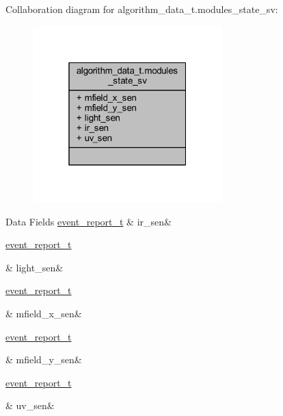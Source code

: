 Collaboration diagram for algorithm\+\_\+data\+\_\+t.\+modules\+\_\+state\+\_\+sv\+:\nopagebreak
\begin{figure}[H]
\begin{center}
\leavevmode
\includegraphics[width=208pt]{dc/dfa/a00894}
\end{center}
\end{figure}
\begin{DoxyFields}{Data Fields}
\hypertarget{a00016_a5e2b6893d5a2a9e34501aaf867eaaf90}{\hyperlink{a00021_d6/d66/a00441}{event\+\_\+report\+\_\+t}}\label{a00016_a5e2b6893d5a2a9e34501aaf867eaaf90}
&
ir\+\_\+sen&
\\
\hline

\hypertarget{a00016_a8f29254ed7e83d28cc0cbc627740d629}{\hyperlink{a00021_d6/d66/a00441}{event\+\_\+report\+\_\+t}}\label{a00016_a8f29254ed7e83d28cc0cbc627740d629}
&
light\+\_\+sen&
\\
\hline

\hypertarget{a00016_a36e4effee17b7c23c775d9abddf77e9b}{\hyperlink{a00021_d6/d66/a00441}{event\+\_\+report\+\_\+t}}\label{a00016_a36e4effee17b7c23c775d9abddf77e9b}
&
mfield\+\_\+x\+\_\+sen&
\\
\hline

\hypertarget{a00016_a2fdd54461101ce9d18996ebe403fc3e5}{\hyperlink{a00021_d6/d66/a00441}{event\+\_\+report\+\_\+t}}\label{a00016_a2fdd54461101ce9d18996ebe403fc3e5}
&
mfield\+\_\+y\+\_\+sen&
\\
\hline

\hypertarget{a00016_a7f1a3b34d9f4f939ecfef2acfa2b17ef}{\hyperlink{a00021_d6/d66/a00441}{event\+\_\+report\+\_\+t}}\label{a00016_a7f1a3b34d9f4f939ecfef2acfa2b17ef}
&
uv\+\_\+sen&
\\
\hline

\end{DoxyFields}
\label{d1/d44/a00098}
\hypertarget{a00016_d1/d44/a00098}{}

